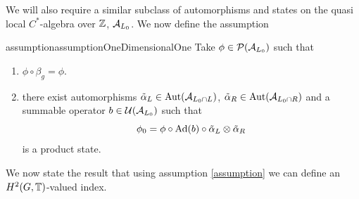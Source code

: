 \documentclass[12pt,a4paper,twoside]{article}
\numberwithin{equation}{section}
\begin{document}
We will also require a similar subclass of automorphisms and states on the quasi local $C^*$-algebra over $\ZZ$, $\AA_{L_0}$. We now define the assumption
\begin{restatable}{assumption}{assumptionOneDimensionalOne}\label{assumption1d}
	Take $\phi\in\PP(\AA_{L_0})$ such that
	\begin{enumerate}
		\item $\phi\circ\beta_g=\phi$.
		\item there exist automorphisms $\tilde\alpha_L\in\Aut{\AA_{L_0\cap L}}$, $\tilde\alpha_R\in\Aut{\AA_{L_0\cap R}}$ and a summable operator $b\in\UU(\AA_{L_0})$ such that
		\begin{equation}
			\phi_0=\phi\circ\Ad{b}\circ\tilde\alpha_{L}\otimes\tilde\alpha_{R}
		\end{equation}
		is a product state.
	\end{enumerate}
\end{restatable}
We now state the result that using assumption \ref{assumption} we can define an $H^2(G,\TT)$-valued index.
\end{document}
